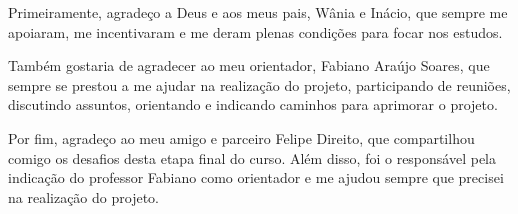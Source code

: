 \begin{agradecimentos}
Primeiramente, agradeço a Deus e aos meus pais, Wânia e Inácio, que sempre me apoiaram, me incentivaram e me deram plenas condições para focar nos estudos.

Também gostaria de agradecer ao meu orientador, Fabiano Araújo Soares, que sempre se prestou a me ajudar na realização do projeto, participando de reuniões, discutindo assuntos, orientando e indicando caminhos para aprimorar o projeto.

Por fim, agradeço ao meu amigo e parceiro Felipe Direito, que compartilhou comigo os desafios desta etapa final do curso. Além disso, foi o responsável pela indicação do professor Fabiano como orientador e me ajudou sempre que precisei na realização do projeto.

\end{agradecimentos}
